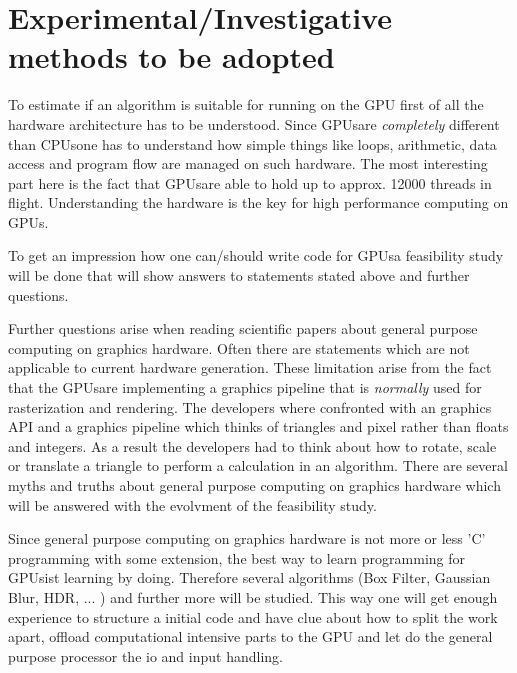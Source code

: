 \section*{Experimental/Investigative methods to be adopted} 
\label{ssub:experimental_investigative_methods_to_be_adopted} 
To estimate if an algorithm is suitable for running on the \gls{GPU} first of all the
hardware architecture has to be understood. Since \glspl{GPU}are \emph{completely}
different than \glspl{CPU}one has to understand how simple things like loops,
arithmetic, data access and program flow are managed on such hardware. The most
interesting part here is the fact that \glspl{GPU}are able to hold up to approx. 12000
threads in flight. Understanding the hardware is the key for high performance 
computing on GPUs.

To get an impression how one can/should write code for \glspl{GPU}a feasibility study
will be done that will show answers to statements stated above and further 
questions. 

Further questions arise when reading scientific papers about general purpose
computing on graphics hardware. Often there are statements which are not
applicable to current hardware generation. These limitation arise from the fact
that the \glspl{GPU}are implementing a graphics pipeline that is \emph{normally} used
for rasterization and rendering. The developers where confronted with an
graphics API and a graphics pipeline which thinks of triangles and pixel rather
than floats and integers. As a result the developers had to think about how to
rotate, scale or translate a triangle to perform a calculation in an algorithm.
There are several myths and truths about general purpose computing on graphics 
hardware which will be answered with the evolvment of the feasibility study. 

Since general purpose computing on graphics hardware is not more or less 'C'
programming with some extension, the best way to learn programming for \glspl{GPU}ist
learning by doing. Therefore several algorithms (Box Filter, Gaussian Blur, HDR,
... ) and further more will be studied.
This way one will get enough experience to structure a initial code and have
clue about how to split the work apart, offload computational intensive parts to
the \gls{GPU} and let do the general purpose processor the io and input handling.

